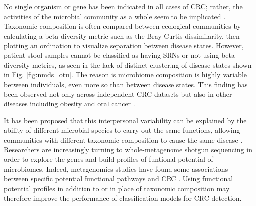 \documentclass[11pt]{article}
\begin{document}
\begin{figure}
    \vspace{-11pt}
    \vspace{-8pt}
\end{figure}
No single organism or gene has been indicated in all cases of CRC;
rather, the activities of the microbial community as a whole seem to be implicated \cite{louis_gut_2014}.
Taxonomic composition is often compared between ecological communities by calculating a beta diversity metric such as the Bray-Curtis dissimilarity, then plotting an ordination to visualize separation between disease states.
However, patient stool samples cannot be classified as having SRNs or not using beta diversity metrics,
as seen in the lack of distinct clustering of disease states shown in Fig. \ref{fig:nmds_otu}.
The reason is microbiome composition is highly variable between individuals, even more so than between disease states.
This finding has been observed not only across independent CRC datasets but also in other diseases including obesity and oral cancer \cite{weir_stool_2013, finucane_taxonomic_2014, perera_inflammatory_2018}.

It has been proposed that this interpersonal variability can be explained by the ability of different microbial species to carry out the same functions,
allowing communities with different taxonomic composition to cause the same disease \cite{franzosa_species-level_2018}.
Researchers are increasingly turning to whole-metagenome shotgun sequencing in order to explore the genes and build profiles of funtional potential of microbiomes.
Indeed, metagenomics studies have found some associations between specific potential functional pathways and CRC \cite{thomas_metagenomic_2019}.
Using functional potential profiles in addition to or in place of taxonomic composition may therefore improve the performance of classification models for CRC detection.
\end{document}
